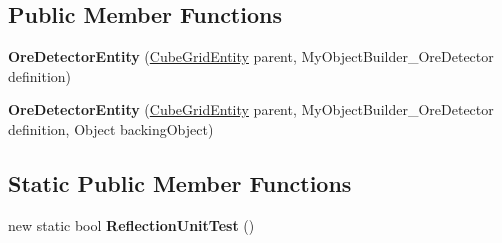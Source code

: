 \subsection*{Public Member Functions}
\begin{DoxyCompactItemize}
\item 
\hypertarget{class_s_e_mod_a_p_i_internal_1_1_a_p_i_1_1_entity_1_1_sector_1_1_sector_object_1_1_cube_grid_1_1734c0c906221c912328658de70b50f1a_ab0d9be4dcfe7315371e7012d98d5ab21}{}{\bfseries Ore\+Detector\+Entity} (\hyperlink{class_s_e_mod_a_p_i_internal_1_1_a_p_i_1_1_entity_1_1_sector_1_1_sector_object_1_1_cube_grid_entity}{Cube\+Grid\+Entity} parent, My\+Object\+Builder\+\_\+\+Ore\+Detector definition)\label{class_s_e_mod_a_p_i_internal_1_1_a_p_i_1_1_entity_1_1_sector_1_1_sector_object_1_1_cube_grid_1_1734c0c906221c912328658de70b50f1a_ab0d9be4dcfe7315371e7012d98d5ab21}

\item 
\hypertarget{class_s_e_mod_a_p_i_internal_1_1_a_p_i_1_1_entity_1_1_sector_1_1_sector_object_1_1_cube_grid_1_1734c0c906221c912328658de70b50f1a_adfe8ec40925100a09765cba3af569d74}{}{\bfseries Ore\+Detector\+Entity} (\hyperlink{class_s_e_mod_a_p_i_internal_1_1_a_p_i_1_1_entity_1_1_sector_1_1_sector_object_1_1_cube_grid_entity}{Cube\+Grid\+Entity} parent, My\+Object\+Builder\+\_\+\+Ore\+Detector definition, Object backing\+Object)\label{class_s_e_mod_a_p_i_internal_1_1_a_p_i_1_1_entity_1_1_sector_1_1_sector_object_1_1_cube_grid_1_1734c0c906221c912328658de70b50f1a_adfe8ec40925100a09765cba3af569d74}

\end{DoxyCompactItemize}
\subsection*{Static Public Member Functions}
\begin{DoxyCompactItemize}
\item 
\hypertarget{class_s_e_mod_a_p_i_internal_1_1_a_p_i_1_1_entity_1_1_sector_1_1_sector_object_1_1_cube_grid_1_1734c0c906221c912328658de70b50f1a_a8f29065f911803c4864d411ee27c5b94}{}new static bool {\bfseries Reflection\+Unit\+Test} ()\label{class_s_e_mod_a_p_i_internal_1_1_a_p_i_1_1_entity_1_1_sector_1_1_sector_object_1_1_cube_grid_1_1734c0c906221c912328658de70b50f1a_a8f29065f911803c4864d411ee27c5b94}

\end{DoxyCompactItemize}
